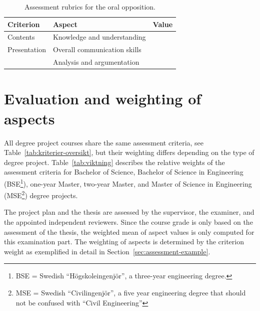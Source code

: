 \documentclass[a4paper,12pt]{book}
\begin{document}
\begin{table}[h]
\centering
\caption{Assessment rubrics for the oral opposition.}
\label{tab:bedomning-muntlig-opposition}
\begin{tabular}{|l|l|l|}
\hline
Criterion      & Aspect                                & Value \\\hline
Contents       & Knowledge and understanding           &       \\\hline     
Presentation   & Overall communication skills          &       \\\hline
               & Analysis and argumentation            &       \\ 
\hline
\end{tabular}
\end{table}



\chapter{Evaluation and weighting of aspects}
\label{chp:aspects}
%
All degree project courses share the same assessment criteria, see
Table~\ref{tab:kriterier-oversikt}, but their weighting differs depending
on the type of degree project.
Table~\ref{tab:viktning} describes the relative weights of the assessment criteria
for Bachelor of Science, Bachelor of Science in Engineering (BSE\footnote{BSE =
Swedish ``Högskoleingenjör'', a three-year engineering degree.}), one-year Master, two-year
Master, and Master of Science in Engineering (MSE\footnote{MSE =
Swedish ``Civilingenjör'', a five year engineering degree that should
not be confused with ``Civil Engineering''}) degree projects.

The project plan and the thesis are assessed by the supervisor, the examiner,
and the appointed independent reviewers. 
Since the course grade is only based on the assessment of the thesis, the
weighted mean of aspect values is only computed for this examination part.
The weighting of aspects is determined by the criterion weight as exemplified
in detail in Section~\ref{sec:assessment-example}.
\end{document}
